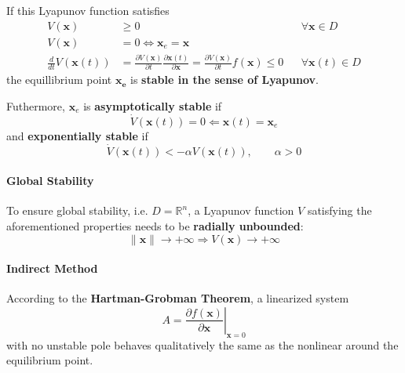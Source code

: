 If this Lyapunov function satisfies
\noindent\begin{align*}
    V(\mathbf{x})                 & \geq 0                                                                                                                                                          &  & \forall \mathbf{x}\in D    \\
    V(\mathbf{x})                 & = 0 \Leftrightarrow \mathbf{x}_e = \mathbf{x}                                                                                                                                                   \\
    \frac{d}{dt} V(\mathbf{x}(t)) & = \frac{\partial V(\mathbf{x})}{\partial t} \frac{\partial \mathbf{x}(t)}{\partial \mathbf{x}} = \frac{\partial V(\mathbf{x})}{\partial t} f(\mathbf{x}) \leq 0 &  & \forall \mathbf{x}(t)\in D
\end{align*}
the equillibrium point $\mathbf{x_e}$ is \textbf{stable in the sense of Lyapunov}.

\newpar{}
Futhermore, $\mathbf{x}_e$ is \textbf{asymptotically stable} if
\noindent\begin{equation*}
    \dot{V}(\mathbf{x}(t)) = 0 \Leftarrow \mathbf{x}(t) = \mathbf{x}_e
\end{equation*}
and \textbf{exponentially stable} if
\noindent\begin{equation*}
    \dot{V}(\mathbf{x}(t)) < -\alpha V(\mathbf{x}(t)), \qquad \alpha>0
\end{equation*}

\paragraph{Global Stability}
To ensure global stability, i.e. $D=\mathbb{R}^n$, a Lyapunov function $V$ satisfying the aforementioned properties needs to be \textbf{radially unbounded}:
\noindent\begin{equation*}
    \|\mathbf{x}\| \to +\infty \Rightarrow V(\mathbf{x}) \to +\infty
\end{equation*}

\paragraph{Indirect Method}
According to the \textbf{Hartman-Grobman Theorem}, a linearized system
\noindent\begin{equation*}
    A = \left.\frac{\partial f(\mathbf{x})}{\partial \mathbf{x}} \right|_{\mathbf{x} = 0}
\end{equation*} with no unstable pole behaves qualitatively the same as the nonlinear around the equilibrium point.

